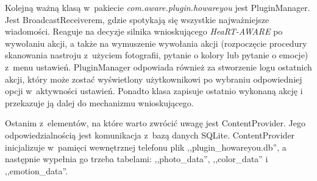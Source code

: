 Kolejną ważną klasą w~pakiecie \textit{com.aware.plugin.howareyou} jest PluginManager. Jest BroadcastReceiverem, gdzie spotykają się wszystkie najważniejsze wiadomości. Reaguje na decyzje silnika wnioskującego \textit{HeaRT-AWARE} po wywołaniu akcji, a także na wymuszenie wywołania akcji (rozpoczęcie procedury skanowania nastroju z~użyciem fotografii, pytanie o kolory lub pytanie o emocje) z~menu ustawień. PluginManager odpowiada również za stworzenie logu ostatnich akcji, który może zostać wyświetlony użytkownikowi po wybraniu odpowiedniej opcji w~aktywności ustawień. Ponadto klasa zapisuje ostatnio wykonaną akcję i przekazuje ją dalej do mechanizmu wnioskującego.

Ostanim z~elementów, na które warto zwrócić uwagę jest ContentProvider. Jego odpowiedzialnością jest komunikacja z~bazą danych SQLite. ContentProvider inicjalizuje w~pamięci wewnętrznej telefonu plik ,,plugin\_howareyou.db'', a następnie wypełnia go trzeba tabelami: ,,photo\_data'', ,,color\_data'' i ,,emotion\_data''.

